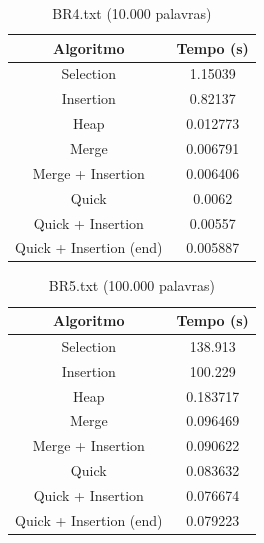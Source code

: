 \documentclass[11pt,a4paper]{article}
\begin{document}
\begin{table}[htb]
\centering
    \caption {BR4.txt (10.000 palavras)}
    \begin{tabular}{|c|c|}
    \toprule
    Algoritmo               & Tempo (s)\\
    \midrule
    Selection               & 1.15039  \\
    Insertion               & 0.82137  \\
    Heap                    & 0.012773 \\
    Merge                   & 0.006791 \\
    Merge + Insertion       & 0.006406 \\
    Quick                   & 0.0062   \\
    Quick + Insertion       & 0.00557  \\
    Quick + Insertion (end) & 0.005887 \\
    \bottomrule
    \end{tabular}
\end{table}

\begin{table}[htb]
\centering
    \caption {BR5.txt (100.000 palavras)}
    \begin{tabular}{|c|c|}
    \toprule
    Algoritmo               & Tempo (s)\\
    \midrule
    Selection               & 138.913  \\
    Insertion               & 100.229  \\
    Heap                    & 0.183717 \\
    Merge                   & 0.096469 \\
    Merge + Insertion       & 0.090622 \\
    Quick                   & 0.083632 \\
    Quick + Insertion       & 0.076674 \\
    Quick + Insertion (end) & 0.079223 \\
    \bottomrule
    \end{tabular}
\end{table}
\end{document}
